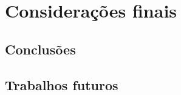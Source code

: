 \chapter{Considerações finais}\label{cap:conclusoes}
\section{Conclusões}

\section{Trabalhos futuros}
